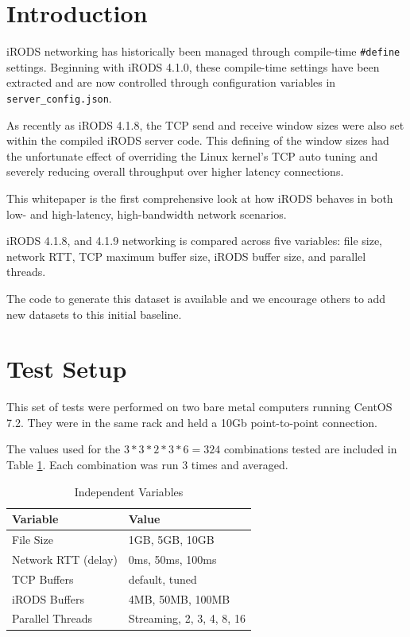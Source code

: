 \documentclass[letter, 11pt]{article}
\begin{document}
\section{Introduction}

iRODS networking has historically been managed through compile-time \texttt{\#define} settings.  Beginning with
iRODS 4.1.0, these compile-time settings have been extracted and are now controlled
through configuration variables in \texttt{server\_config.json}.

As recently as iRODS 4.1.8, the TCP send and receive window sizes were also set within the compiled iRODS server code.  This
defining of the window sizes had the unfortunate effect of overriding the Linux kernel's TCP auto tuning and severely reducing
overall throughput over higher latency connections.

This whitepaper is the first comprehensive look at how iRODS behaves in both low- and high-latency, high-bandwidth network scenarios.

iRODS 4.1.8, and 4.1.9 networking is compared across five variables: file size, network RTT, TCP maximum buffer size, iRODS buffer size, and parallel threads.

The code to generate this dataset is available and we encourage others to add new datasets to this initial baseline.

\clearpage
\section{Test Setup}

This set of tests were performed on two bare metal computers running CentOS 7.2.  They were in the same rack and held a 10Gb point-to-point connection.

The values used for the $3*3*2*3*6 = 324$ combinations tested are included in Table \ref{variables-tested}.  Each combination was run 3 times and averaged.

\begin{table}[h]
\centering
\begin{tabular}{ll}
Variable & Value \\
\hline
File Size & 1GB, 5GB, 10GB   \\
Network RTT (delay) & 0ms, 50ms, 100ms \\
TCP Buffers & default, tuned  \\
iRODS Buffers & 4MB, 50MB, 100MB \\
Parallel Threads & Streaming, 2, 3, 4, 8, 16
\end{tabular}
\caption{Independent Variables}
\label{variables-tested}
\end{table}
\end{document}
